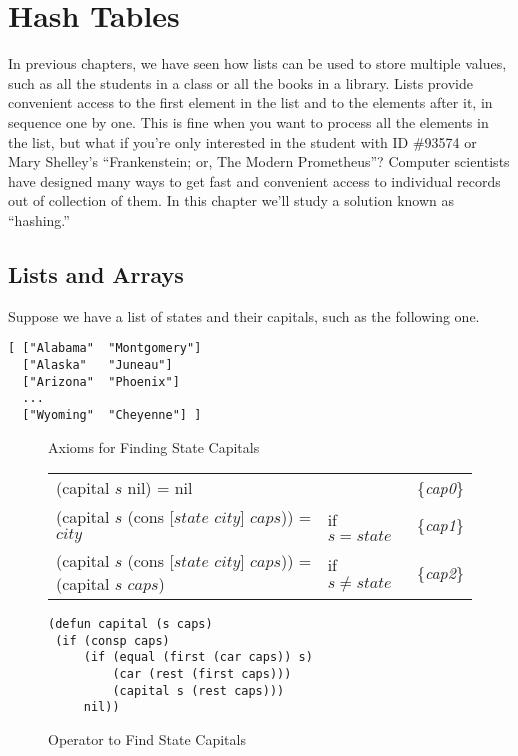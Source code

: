 \chapter{Hash Tables}
\label{ch:hash-tables}

In previous chapters, we have seen how lists can be used to store
multiple values, such as all the students in a class or all the books
in a library. Lists provide convenient access to the first element
in the list and to the elements after it, in sequence one by one.
This is fine when you want to
process all the elements in the list, but what if you're only interested
in the student with ID \#93574 or Mary Shelley's ``Frankenstein; or,
The Modern Prometheus''?
Computer scientists have designed many
ways to get fast and convenient access
to individual records out of collection of them.
In this chapter we'll study a solution known as ``hashing.''

\section{Lists and Arrays}

Suppose we have a list of states and their capitals,
such as the following one.\label{states-capitals-list}
\begin{Verbatim}
[ ["Alabama"  "Montgomery"]
  ["Alaska"   "Juneau"]
  ["Arizona"  "Phoenix"]
  ...
  ["Wyoming"  "Cheyenne"] ]
\end{Verbatim}

\begin{figure}
\begin{center}
Axioms for Finding State Capitals
\begin{tabular}{lll}
(capital $s$ nil) = nil                               &             & \{\emph{cap0}\} \\
(capital $s$ (cons [$state$ $city$] $caps$)) = $city$ &if $s=state$ & \{\emph{cap1}\} \\
(capital $s$ (cons [$state$ $city$] $caps$)) = (capital $s$ $caps$) & if $s \neq state$ & \{\emph{cap2}\} \\
\end{tabular}
\begin{Verbatim}
(defun capital (s caps)
 (if (consp caps)
     (if (equal (first (car caps)) s)
         (car (rest (first caps)))
         (capital s (rest caps)))
     nil))
\end{Verbatim}
\caption{Operator to Find State Capitals}
\label{fig:state-capital-operator}
\end{center}
\end{figure}

